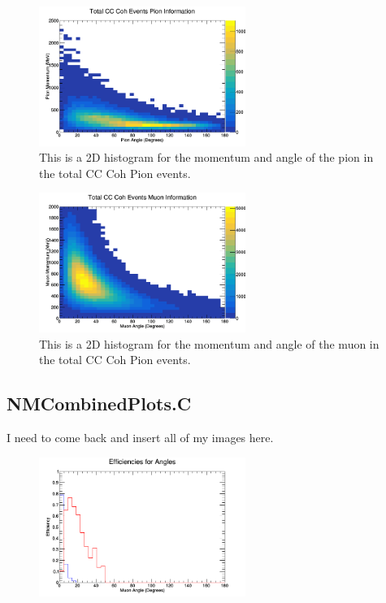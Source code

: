 \documentclass[11pt]{article}
\begin{document}
\begin{figure}[H]
\centering
\includegraphics[width=0.6\textwidth]{NewANMBergerSehgalImages/8-TotalCCCohPionInfoANMBS.png}
\caption{This is a 2D histogram for the momentum and angle of the pion in the total CC Coh Pion events.}
\end{figure}

\begin{figure}[H]
\centering
\includegraphics[width=0.6\textwidth]{NewANMBergerSehgalImages/9-TotalCCCohMuonInfoANMBS.png}
\caption{This is a 2D histogram for the momentum and angle of the muon in the total CC Coh Pion events.}
\end{figure}


\subsection{NMCombinedPlots.C}
I need to come back and insert all of my images here.

\begin{figure}[H]
\centering
\includegraphics[width=0.6\textwidth]{NMCombinedPlotsImages/1-NMCombinedPlots.png}
\caption{}
\end{figure}
\end{document}
